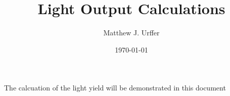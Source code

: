 \documentclass[draftcls,onecolumn]{IEEEtran}
\begin{document}
\title{Light Output Calculations}
\author{Matthew J. Urffer}
\date{\today}
\maketitle

\listoftodos
\printnomenclature
\printindex
\tableofcontents
\listoffigures
\listoftables
\lstlistoflistings

The calcuation of the light yield will be demonstrated in this document

\end{document}
